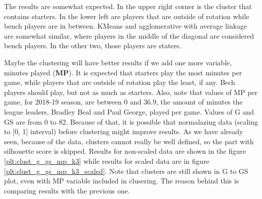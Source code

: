 \documentclass[a4paper]{article}
\begin{document}
The results are somewhat expected. In the upper right corner is the cluster that contains starters. In the lower left are players that are outside of rotation while bench players are in between. KMeans and agglomerative with average linkage are somewhat similar, where players in the middle of the diagonal are considered bench players. In the other two, those players are staters.

Maybe the clustering will have better results if we add one more variable, minutes played (\textbf{MP}). It is expected that starters play the most minutes per game, while players that are outside of rotation play the least, if any. Bech players should play, but not as much as starters. Also, note that values of MP per game, for 2018-19 season, are between 0 and 36.9, the amount of minutes the league leaders, Bradley Beal and Paul George, played per game. Values of G and GS are from 0 to 82. Because of that, it is possible that normalazing data (scaling to [0, 1] interval) before clustering might improve results. As we have already seen, because of the data, clusters cannot really be well defined, so the part with silhouette score is skipped. Results for non-scaled data are shown in the figure \ref{plt:clust_g_gs_mp_k3} while results for scaled data are in figure \ref{plt:clust_g_gs_mp_k3_scaled}. Note that clusters are still shown in G to GS plot, even with MP variable included in clusering. The reason behind this is comparing results with the previous one.
\end{document}
